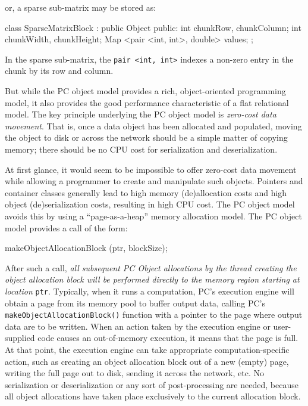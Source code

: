 or, a sparse sub-matrix may be stored as:

\begin{codesmall}
class SparseMatrixBlock : public Object {
public:
	int chunkRow, chunkColumn;
	int chunkWidth, chunkHeight;
	Map <pair <int, int>, double> values; 
};
\end{codesmall}

In the sparse sub-matrix, the \texttt{pair <int, int>} indexes a non-zero entry in the chunk by its row and column.

But while the PC object model provides a rich, object-oriented programming model, it also provides the good performance characteristic
of a flat relational model.
The key principle underlying the PC object model is \emph{zero-cost data movement}.  That is, once a data object
has been allocated and populated, moving the object to disk or across
the network should be a simple matter of copying memory; there
should be no CPU cost for serialization and deserialization.

At first glance, it would seem to be impossible to offer zero-cost data movement while allowing a programmer to create and manipulate such objects.  
Pointers and container classes 
generally lead to high memory (de)allocation costs and high object (de)serialization costs, resulting in high CPU cost.
The PC object model avoids this 
by using a ``page-as-a-heap'' memory allocation model.  
The PC object model provides a call of the form:

\begin{codesmall}
makeObjectAllocationBlock (ptr, blockSize);
\end{codesmall}

After such a call, \emph{all subsequent PC Object allocations by the thread creating the object allocation block will be performed directly to the memory
region starting at location} \texttt{ptr}.
Typically, when it runs a computation, PC's execution engine will obtain a page from its memory pool to buffer output data, calling
PC's
\texttt{makeObjectAllocationBlock()} function with a pointer to the page where output data are to be written.  
When an action taken by the execution engine or user-supplied code causes an
out-of-memory execution, it means that the page is full.  At that point, the execution engine can take appropriate computation-specific 
action, such as creating 
an object allocation block out of a new (empty) page, writing the full page out to disk, sending it across the network, etc.  
No serialization or deserialization or any sort of post-processing are needed, 
because all object allocations have taken place exclusively to the current allocation block.  

